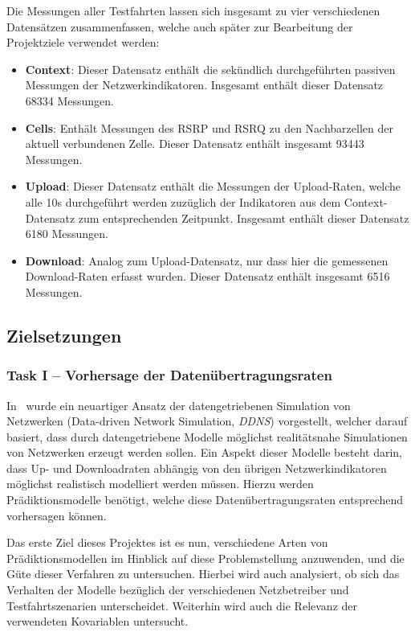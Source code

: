 Die Messungen aller Testfahrten lassen sich insgesamt zu vier verschiedenen Datens\"atzen zusammenfassen, welche auch sp\"ater
zur Bearbeitung der Projektziele verwendet werden:
\begin{itemize}
    \item \textbf{Context}: Dieser Datensatz enth\"alt die sek\"undlich durchgef\"uhrten passiven Messungen der Netzwerkindikatoren.
        Insgesamt enth\"alt dieser Datensatz 68334 Messungen.
    \item \textbf{Cells}: Enth\"alt Messungen des RSRP und RSRQ zu den Nachbarzellen der aktuell verbundenen Zelle.
        Dieser Datensatz enth\"alt insgesamt 93443 Messungen.
    \item \textbf{Upload}: Dieser Datensatz enth\"alt die Messungen der Upload-Raten, welche alle 10s durchgef\"uhrt werden zuz\"uglich
        der Indikatoren aus dem Context-Datensatz zum entsprechenden Zeitpunkt. Insgesamt enth\"alt dieser Datensatz 6180 Messungen.
    \item \textbf{Download}: Analog zum Upload-Datensatz, nur dass hier die gemessenen Down\-load-Ra\-ten erfasst wurden.
        Dieser Datensatz enth\"alt insgesamt 6516 Messungen.
\end{itemize}

\subsection{Zielsetzungen}

\subsubsection{Task I -- Vorhersage der Daten\"ubertragungsraten}

In~\cite{IEEE} wurde ein neuartiger Ansatz der datengetriebenen Simulation von Netzwerken
(Data-driven Network Simulation, \textit{DDNS}) vorgestellt, welcher darauf basiert, dass durch datengetriebene Modelle m\"oglichst
realit\"atsnahe Simulationen von Netzwerken erzeugt werden sollen.
Ein Aspekt dieser Modelle besteht darin, dass Up- und Down\-load\-ra\-ten abh\"angig von den \"ubrigen Netzwerkindikatoren 
m\"oglichst realistisch modelliert werden m\"ussen.
Hierzu werden Pr\"adiktionsmodelle ben\"otigt, welche diese Da\-ten\-\"uber\-tra\-gungs\-ra\-ten entsprechend vorhersagen k\"onnen.

Das erste Ziel dieses Projektes ist es nun, verschiedene Arten von Pr\"a\-dik\-tions\-mo\-dellen im Hinblick auf diese Problemstellung
an\-zu\-wen\-den, und die G\"ute dieser Verfahren zu untersuchen.
Hierbei wird auch analysiert, ob sich das Verhalten der Modelle bez\"uglich der verschiedenen Netzbetreiber und Testfahrtszenarien
unterscheidet.
Weiterhin wird auch die Relevanz der verwendeten Kovariablen untersucht.

